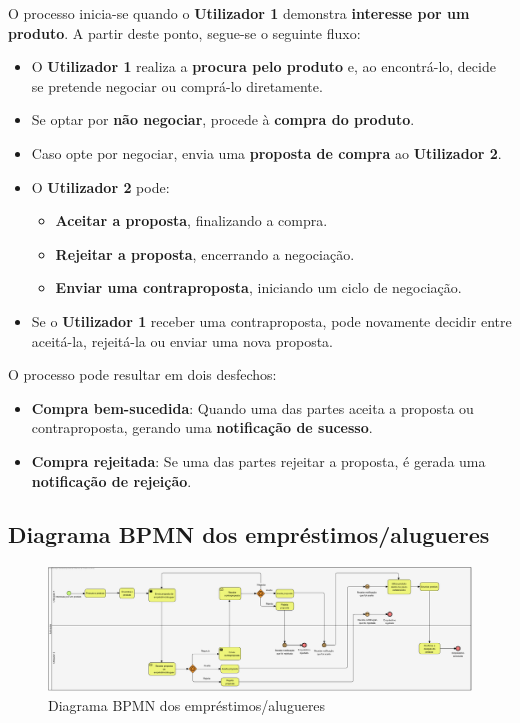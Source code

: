 \documentclass[a4paper, 12pt]{article} %
\begin{document}
O processo inicia-se quando o \textbf{Utilizador 1} demonstra \textbf{interesse por um produto}. A partir deste ponto, segue-se o seguinte fluxo:

\begin{itemize}
	\item O \textbf{Utilizador 1} realiza a \textbf{procura pelo produto} e, ao encontrá-lo, decide se pretende negociar ou comprá-lo diretamente.
	\item Se optar por \textbf{não negociar}, procede à \textbf{compra do produto}.
	\item Caso opte por negociar, envia uma \textbf{proposta de compra} ao \textbf{Utilizador 2}.
	\item O \textbf{Utilizador 2} pode:
	\begin{itemize}
		\item \textbf{Aceitar a proposta}, finalizando a compra.
		\item \textbf{Rejeitar a proposta}, encerrando a negociação.
		\item \textbf{Enviar uma contraproposta}, iniciando um ciclo de negociação.
	\end{itemize}
	\item Se o \textbf{Utilizador 1} receber uma contraproposta, pode novamente decidir entre aceitá-la, rejeitá-la ou enviar uma nova proposta.
\end{itemize}


O processo pode resultar em dois desfechos:
\begin{itemize}
	\item \textbf{Compra bem-sucedida}: Quando uma das partes aceita a proposta ou contraproposta, gerando uma \textbf{notificação de sucesso}.
	\item \textbf{Compra rejeitada}: Se uma das partes rejeitar a proposta, é gerada uma \textbf{notificação de rejeição}.
\end{itemize}

\subsection{Diagrama BPMN dos empréstimos/alugueres}

\begin{figure}[ht]
	\centering
	\includegraphics[width=\textwidth]{../images/bpmn-rentals.png}
	\caption{Diagrama BPMN dos empréstimos/alugueres}
	\label{fig:bpmn emprestimo/aluguer}
\end{figure}
\end{document}
